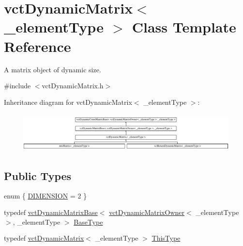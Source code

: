 \hypertarget{classvct_dynamic_matrix}{}\section{vct\+Dynamic\+Matrix$<$ \+\_\+element\+Type $>$ Class Template Reference}
\label{classvct_dynamic_matrix}


A matrix object of dynamic size.  




{\ttfamily \#include $<$vct\+Dynamic\+Matrix.\+h$>$}

Inheritance diagram for vct\+Dynamic\+Matrix$<$ \+\_\+element\+Type $>$\+:\begin{figure}[H]
\begin{center}
\leavevmode
\includegraphics[height=2.101313cm]{dd/d81/classvct_dynamic_matrix}
\end{center}
\end{figure}
\subsection*{Public Types}
\begin{DoxyCompactItemize}
\item 
enum \{ \hyperlink{group__cisst_vector_gga20a06ac370f39d094a3249a08644471aa6b17aeb32aa45c3a75bad3506c9218dc}{D\+I\+M\+E\+N\+S\+I\+O\+N} = 2
 \}
\item 
typedef \hyperlink{classvct_dynamic_matrix_base}{vct\+Dynamic\+Matrix\+Base}$<$ \hyperlink{classvct_dynamic_matrix_owner}{vct\+Dynamic\+Matrix\+Owner}$<$ \+\_\+element\+Type $>$, \+\_\+element\+Type $>$ \hyperlink{classvct_dynamic_matrix_a80b366a0b1c03c7a5453e76aea1fbe83}{Base\+Type}
\item 
typedef \hyperlink{classvct_dynamic_matrix}{vct\+Dynamic\+Matrix}$<$ \+\_\+element\+Type $>$ \hyperlink{classvct_dynamic_matrix_a49440a1600af9e5cbce01b74a66434bd}{This\+Type}
\end{DoxyCompactItemize}

